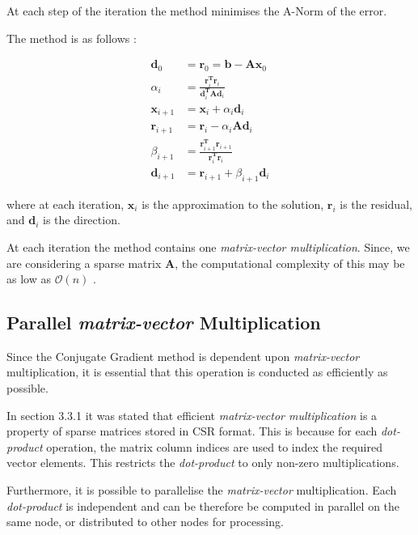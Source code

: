At each step of the iteration the method minimises the A-Norm of the error.

The method is as follows \cite{cg-without-pain}:

\begin{align}
\mathbf{d}_0 &= \mathbf{r}_0 = \mathbf{b} - \mathbf{A}\mathbf{x}_0 \\
\alpha_i &= \frac{\mathbf{r}_i^{\mathbf{T}}\mathbf{r}_i}{\mathbf{d}_i^{\mathbf{T}}\mathbf{A}\mathbf{d}_i} \\
\mathbf{x}_{i+1} &= \mathbf{x}_i + \alpha_i \mathbf{d}_i \\
\mathbf{r}_{i+1} &= \mathbf{r}_i - \alpha_i \mathbf{A} \mathbf{d}_i \\
\beta_{i+1} &= \frac{\mathbf{r}_{i+1}^\mathbf{T} \mathbf{r}_{i+1}}{\mathbf{r}_{i}^\mathbf{T} \mathbf{r}_{i}} \\
\mathbf{d}_{i+1} &= \mathbf{r}_{i+1} + \beta_{i+1}\mathbf{d}_i
\end{align}

where at each iteration, $\mathbf{x}_i$ is the approximation to the solution, $\mathbf{r}_i$ is the residual, and $\mathbf{d}_i$ is the direction. 

At each iteration the method contains one \emph{matrix-vector multiplication}. Since, we are considering a sparse matrix $\mathbf{A}$, the computational complexity of this may be as low as $\mathcal{O}(n)$ \cite{numerical-linear-algebra}.


%
%
\subsection{Parallel \emph{matrix-vector} Multiplication}

Since the Conjugate Gradient method is dependent upon \emph{matrix-vector} multiplication, it is essential that this operation is conducted as efficiently as possible.

In section 3.3.1 it was stated that efficient \emph{matrix-vector multiplication} is a property of sparse matrices stored in CSR format. This is because for each \emph{dot-product} operation, the matrix column indices are used to index the required vector elements. This restricts the \emph{dot-product} to only non-zero multiplications.

Furthermore, it is possible to parallelise the \emph{matrix-vector} multiplication. Each \emph{dot-product} is independent and can be therefore be computed in parallel on the same node, or distributed to other nodes for processing.


